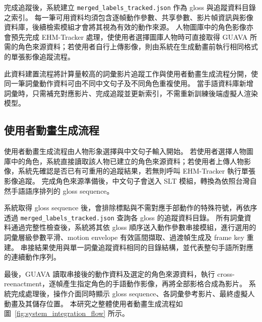 \documentclass[class=NCU_thesis, crop=false]{standalone}
\begin{document}
完成追蹤後，系統建立 \texttt{merged\_labels\_tracked.json} 作為 gloss 與追蹤資料目錄之索引。
每一筆可用資料均須包含逐幀動作參數、共享參數、影片幀資訊與影像資料庫，後續檢索模組才會將其視為有效的動作來源。
人物圖庫中的角色影像亦會預先完成 EHM-Tracker 處理，使使用者選擇圖庫人物時可直接取得 GUAVA 所需的角色來源資料；若使用者自行上傳影像，則由系統在生成動畫前執行相同格式的單張影像追蹤流程。

此資料建置流程將計算量較高的詞彙影片追蹤工作與使用者動畫生成流程分開，使同一筆詞彙動作資料可由不同中文句子及不同角色重複使用。
當手語資料庫新增詞彙時，只需補充對應影片、完成追蹤並更新索引，不需重新訓練後端虛擬人渲染模型。

\subsection{使用者動畫生成流程}
\label{sec:system_integration_flow}

使用者動畫生成流程由人物形象選擇與中文句子輸入開始。
若使用者選擇人物圖庫中的角色，系統直接讀取該人物已建立的角色來源資料；若使用者上傳人物影像，系統先確認是否已有可重用的追蹤結果，若無則呼叫 EHM-Tracker 執行單張影像追蹤。
完成角色來源準備後，中文句子會送入 SLT 模組，轉換為依照台灣自然手語語序排列的 gloss sequence。

系統取得 gloss sequence 後，會排除標點與不需對應手部動作的特殊符號，再依序透過 \texttt{merged\_labels\_tracked.json} 查詢各 gloss 的追蹤資料目錄。
所有詞彙資料通過完整性檢查後，系統將其依 gloss 順序送入動作參數串接模組，進行選用的詞彙層級參數平滑、motion envelope 有效區間擷取、過渡幀生成及 frame key 重建。
串接結果使用與單一詞彙追蹤資料相同的目錄結構，並代表整句手語所對應的連續動作序列。

最後，GUAVA 讀取串接後的動作資料及選定的角色來源資料，執行 cross-reenactment，逐幀產生指定角色的手語動作影像，再將全部影格合成為影片。
系統完成處理後，操作介面同時顯示 gloss sequence、各詞彙參考影片、最終虛擬人動畫及其儲存位置。
本研究之整體使用者動畫生成流程如圖~\ref{fig:system_integration_flow} 所示。
\end{document}
